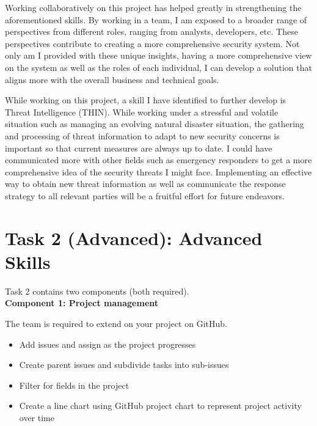 \documentclass[a4paper, 11pt]{report}
\begin{document}
Working collaboratively on this project has helped greatly in strengthening the aforementioned skills. By working in a team, I am exposed to a broader range of perspectives from different roles, ranging from analysts, developers, etc. These perspectives contribute to creating a more comprehensive security system. Not only am I provided with these unique insights, having a more comprehensive view on the system as well as the roles of each individual, I can develop a solution that aligns more with the overall business and technical goals.

While working on this project, a skill I have identified to further develop is Threat Intelligence (THIN). While working under a stressful and volatile situation such as managing an evolving natural disaster situation, the gathering and processing of threat information to adapt to new security concerns is important so that current measures are always up to date. I could have communicated more with other fields such as emergency responders to get a more comprehensive idea of the security threats I might face. Implementing an effective way to obtain new threat information as well as communicate the response strategy to all relevant parties will be a fruitful effort for future endeavors.



\newpage
\section{Task 2 (Advanced): Advanced Skills}

Task 2 contains two components (both required).\\[2mm]

\textbf{Component 1: Project management}

The team is required to extend on your project on GitHub.

\begin{itemize}
    \item Add issues and assign as the project progresses
    \item Create parent issues and subdivide tasks into sub-issues
    \item Filter for fields in the project
    \item Create a line chart using GitHub project chart to represent project activity over time
\end{itemize} 
\end{document}
